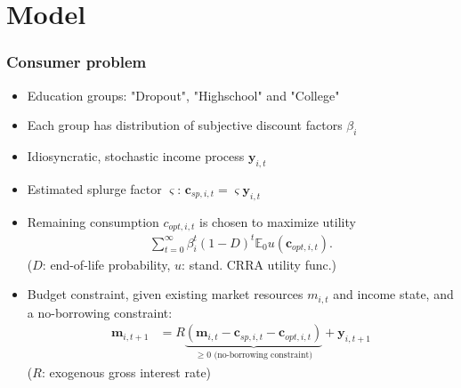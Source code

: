 \documentclass[pdflatex,aspectratio=169]{beamer}
\begin{document}
\section{Model}

\begin{frame}
\frametitle{Consumer problem}


	\begin{itemize}
		\item Education groups: "Dropout", "Highschool" and "College"
		\item Each group has distribution of subjective discount factors $\beta_i$
		\item Idiosyncratic, stochastic income process $\mathbf{y}_{i,t}$
		\item Estimated splurge factor $\varsigma$: $\mathbf{c}_{sp,i,t} = \varsigma \mathbf{y}_{i,t}$
		\pause
		\item Remaining consumption $c_{opt,i,t}$ is chosen to maximize utility
			\begin{align}
			\sum_{t=0}^{\infty}\beta_i^t (1-D)^t \mathbb{E}_0 u(\mathbf{c}_{opt,i,t}).
			\end{align}
			($D$: end-of-life probability, $u$: stand. CRRA utility func.)	
		\item Budget constraint, given existing market resources $m_{i,t}$ and income state, and a no-borrowing constraint: 
		\begin{align}
		\mathbf{m}_{i,t+1} &= R \underbrace{(\mathbf{m}_{i,t} - \mathbf{c}_{sp,i,t} - \mathbf{c}_{opt,i,t})}_{\geq 0 \text{ (no-borrowing constraint)}} + \mathbf{y}_{i,t+1}
		\end{align}
		($R$: exogenous gross interest rate)
	\end{itemize}



\end{frame}
\end{document}
